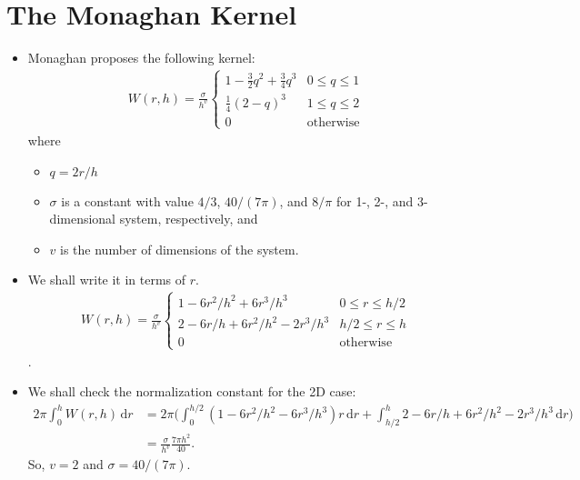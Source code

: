 \documentclass[10pt]{article}
\newcommand{\dee}{\mathrm{d}}
\begin{document}
  \section{The Monaghan Kernel}
  
  \begin{itemize}
    \item Monaghan proposes the following kernel:
    \begin{align*}
      W(r, h) = \frac{\sigma}{h^v}
      \begin{cases}
        1 - \frac{3}{2}q^2 + \frac{3}{4}q^3 & 0 \leq q \leq 1\\
        \frac{1}{4}(2 - q)^3 & 1 \leq q \leq 2\\
        0 & \mathrm{otherwise}
      \end{cases}
    \end{align*}
    where
    \begin{itemize}
      \item $q = 2r/h$
      \item $\sigma$ is a constant with value $4/3$, $40/(7\pi)$, and $8/\pi$ for 1-, 2-, and 3-dimensional system, respectively, and
      \item $v$ is the number of dimensions of the system.
    \end{itemize}

    \item We shall write it in terms of $r$.
    \begin{align*}
      W(r, h) = \frac{\sigma}{h^v}
      \begin{cases}
        1 - 6r^2/h^2 + 6r^3/h^3 & 0 \leq r \leq h/2\\
        2 - 6r/h + 6r^2/h^2 - 2r^3/h^3 & h/2 \leq r \leq h\\
        0 & \mathrm{otherwise}
      \end{cases}
    \end{align*}.

    \item We shall check the normalization constant for the 2D case:
    \begin{align*}
      2\pi \int_0^h W(r,h)\, \dee r
      &= 2\pi \bigg(\int_0^{h/2} (1 - 6r^2/h^2 - 6r^3/h^3)r \, \dee r + \int_{h/2}^h 2 - 6r/h + 6r^2/h^2 - 2r^3/h^3\, \dee r\bigg)\\
      &= \frac{\sigma}{h^v} \frac{7\pi h^2}{40}.
    \end{align*}
    So, $v = 2$ and $\sigma = 40/(7\pi)$.


\end{itemize}
\end{document}

